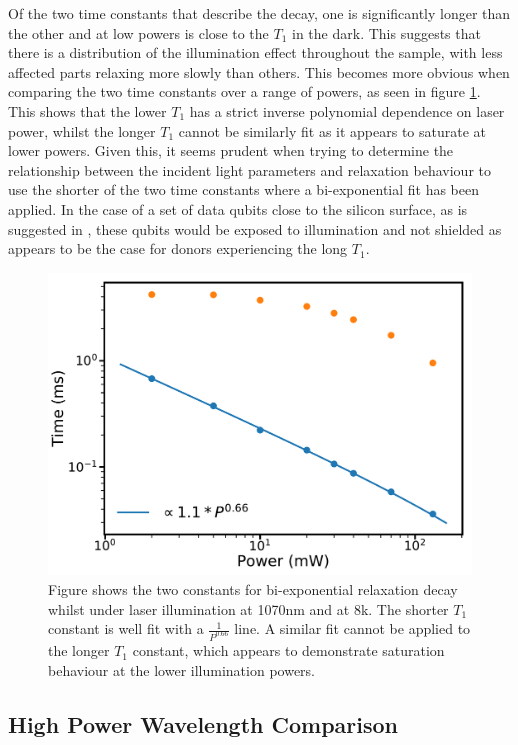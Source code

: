 Of the two time constants that describe the decay, one is significantly longer than the other and at low powers is close to the $T_1$ in the dark.
This suggests that there is a distribution of the illumination effect throughout the sample, with less affected parts relaxing more slowly than others. 
This becomes more obvious when comparing the two time constants over a range of powers, as seen in figure \ref{fig:T1avsT1b}.
This shows that the lower $T_1$ has a strict inverse polynomial dependence on laser power, whilst the longer $T_1$ cannot be similarly fit as it appears to saturate at lower powers.
Given this, it seems prudent when trying to determine the relationship between the incident light parameters and relaxation behaviour to use the shorter of the two time constants where a bi-exponential fit has been applied.
In the case of a set of data qubits close to the silicon surface, as is suggested in \cite{OGorman2014}, these qubits would be exposed to illumination and not shielded as appears to be the case for donors experiencing the long $T_1$.



\begin{figure}
\centering
\includegraphics[width = 0.8\columnwidth]{Figures/hpT1avsT1b.pdf} 
\caption[Bi-exponential relaxation decay constants]{Figure shows the two constants for bi-exponential relaxation decay whilst under laser illumination at 1070nm and at 8k. The shorter $T_1$ constant is well fit with a $\frac{1}{P^{0.66}}$ line. A similar fit cannot be applied to the longer $T_1$ constant, which appears to demonstrate saturation behaviour at the lower illumination powers.}
\label{fig:T1avsT1b}
\end{figure}

\subsection{High Power Wavelength Comparison}
